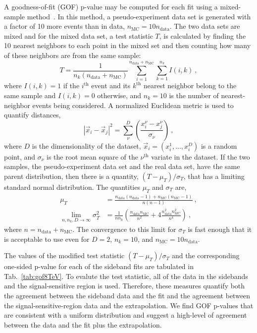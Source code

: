 A goodness-of-fit (GOF) p-value may be computed for each fit using a
mixed-sample method~\cite{Williams:2010vh,10.2307/2289012}. In this method, a
pseudo-experiment data set is generated with a factor of 10 more
events than in data, $n_\mathrm{MC} = 10n_\mathrm{data}$. The two data sets are mixed and for the mixed
data set, a test statistic $T$, is calculated by finding the 10 nearest
neighbors to each point in the mixed set and then counting how many of
these neighbors are from the same sample:
\begin{equation}
T = \frac{1}{n_k(n_\mathrm{data}+n_\mathrm{MC})}\sum_{i=1}^{n_\mathrm{data}+n_\mathrm{MC}}\sum_{k=1}^{n_k} I(i,k)~,
\end{equation}
where $I(i,k)=1$ if the $i^{\mathrm{th}}$ event and its
$k^{\mathrm{th}}$ nearest neighbor belong to the same sample and
$I(i,k)=0$ otherwise, and $n_k=10$ is the number of nearest-neighbor
events being considered. A normalized Euclidean metric is used to quantify distances,
\begin{equation}
|\vec x_i - \vec x_j|^2  =\sum_{\nu}^D\left ( \frac{x_i^\nu-x_j^\nu}{\sigma_{\nu}} \right)~,
\end{equation}
where $D$ is the dimensionality of the dataset, $\vec x_i =
(x_i^1,...,x_i^D)$ is a random point, and $\sigma_{\nu}$ is the
root mean square of the $\nu^{\mathrm{th}}$ variate in the dataset. If
the two samples, the pseudo-experiment data set and the real data
set, have the same parent distribution, then there is a quantity,
$(T-\mu_T)/\sigma_T$, that has a limiting standard normal
distribution. The quantities $\mu_T$ and $\sigma_T$ are,
\begin{align}
\mu_T &=
        \frac{n_\mathrm{data}(n_\mathrm{data}-1)+n_\mathrm{MC}(n_\mathrm{MC}-1)}{n(n-1)}~,\\
\lim_{n,n_k,D\to\infty}\sigma_T^2 &=\frac{1}{nn_k}\left (
                                    \frac{n_\mathrm{data}n_\mathrm{MC}}{n^2}
                                    + 4\frac{n_\mathrm{data}^2n_\mathrm{MC}^2}{n^4}\right)~,
\end{align}
where $n=n_\mathrm{data}+n_\mathrm{MC}$. The convergence to this limit
for $\sigma_T$ is fast enough that it is acceptable to use even for $D=2$,
$n_k=10$, and $n_\mathrm{MC}=10n_\mathrm{data}$.

The values of the modified test statistic $(T-\mu_T)/\sigma_T$ and the
corresponding one-sided p-value for each of the sideband fits are
tabulated in Tab.~\ref{tab:gof8TeV}. To evalute the test statistic, all of the data in the sidebands
   and the signal-sensitive region is used. Therefore, these measures
   quantify both the agreement between the sideband
   data and the fit and the agreement between the signal-sensitive-region
   data and the extrapolation. We find GOF p-values that are consistent with a
   uniform distribution and suggest a high-level of agreement between
   the data and the fit plus the extrapolation.

